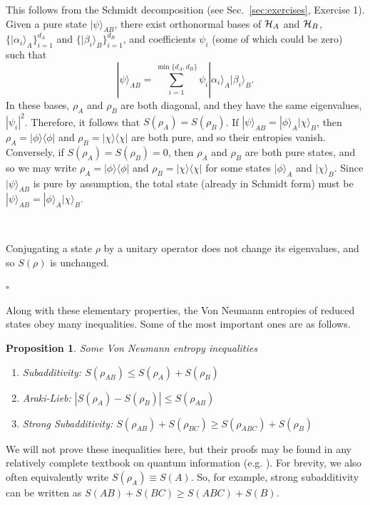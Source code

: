 \documentclass[a4paper,11pt]{article}
\newtheorem{prop}[thm]{Proposition}
\newcommand{\eop}{{\hspace*{\fill}$\square$}}
\newcommand{\Sec}[1]{Sec.~\ref{#1}}
\newcommand{\ket}[1]{|#1\rangle}
\newcommand{\ketbra}[2]{| #1 \rangle \langle #2 |}
\newcommand{\Hil}{{\cal H}}
\begin{document}
 This follows from the Schmidt decomposition (see \Sec{sec:exercises}, Exercise 1).
Given a pure state $\ket{\psi}_{AB}$, there exist orthonormal bases of $\Hil_A$ and $\Hil_B$, $\{\ket{\alpha_i}_A\}_{i=1}^{d_A}$ and $\{\ket{\beta_i}_B\}_{i=1}^{d_B}$, and coefficients $\psi_i$ (some of which could be zero) such that
\begin{equation}
\ket{\psi}_{AB} = \sum_{i=1}^{\min\{d_A,d_B\}} \psi_i \ket{\alpha_i}_A \ket{\beta_i}_B .
\end{equation}
In these bases, $\rho_A$ and $\rho_B$ are both diagonal, and they have the same eigenvalues, $|\psi_i|^2$.
Therefore, it follows that $S(\rho_A) = S(\rho_B)$.
If $\ket{\psi}_{AB} = \ket{\phi}_A \ket{\chi}_B$, then $\rho_A = \ketbra{\phi}{\phi}$ and $\rho_B = \ketbra{\chi}{\chi}$ are both pure, and so their entropies vanish.
Conversely, if $S(\rho_A) = S(\rho_B) = 0$, then $\rho_A$ and $\rho_B$ are both pure states, and so we may write $\rho_A = \ketbra{\phi}{\phi}$ and $\rho_B = \ketbra{\chi}{\chi}$ for some states $\ket{\phi}_A$ and $\ket{\chi}_B$.
Since $\ket{\psi}_{AB}$ is pure by assumption, the total state (already in Schmidt form) must be $\ket{\psi}_{AB} = \ket{\phi}_A \ket{\chi}_B$.

~

 Conjugating a state $\rho$ by a unitary operator does not change its eigenvalues, and so $S(\rho)$ is unchanged.

\eop

Along with these elementary properties, the Von Neumann entropies of reduced states obey many inequalities.
Some of the most important ones are as follows.
\begin{prop} \label{prop:Sineqs}
Some Von Neumann entropy inequalities
\begin{enumerate}[label=(\roman*)]
\item Subadditivity: $S(\rho_{AB}) \leq S(\rho_A) + S(\rho_B)$
\item Araki-Lieb: $|S(\rho_A) - S(\rho_B)| \leq S(\rho_{AB})$
\item Strong Subadditivity: $S(\rho_{AB}) + S(\rho_{BC}) \geq S(\rho_{ABC}) + S(\rho_B)$
\end{enumerate}
\end{prop}
We will not prove these inequalities here, but their proofs may be found in any relatively complete textbook on quantum information (e.g. \cite{nielsen_chuang_2010}).
For brevity, we also often equivalently write $S(\rho_A) \equiv S(A)$.
So, for example, strong subadditivity can be written as $S(AB) + S(BC) \geq S(ABC) + S(B)$.
\end{document}
